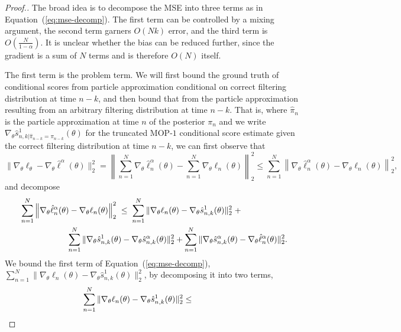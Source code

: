 \begin{proof}[Proof.]    
The broad idea is to decompose the MSE into three terms as in Equation~(\ref{eq:mse-decomp}).
The first term can be controlled by a mixing argument, the second term garners $O(Nk)$ error, and the third term is $O\left(\frac{N}{1-\alpha}\right)$.
It is unclear whether the bias can be reduced further, since the gradient is a sum of $N$ terms and is therefore $O(N)$ itself. 

The first term is the problem term. We will first bound the ground truth of conditional scores from particle approximation conditional on correct filtering distribution at time $n-k$, and then bound that from the particle approximation resulting from an arbitrary filtering distribution at time $n-k$. That is, where $\hat\pi_n$ is the particle approximation at time $n$ of the posterior $\pi_n$ and we write $\nabla_\theta\hat s_{n,k|\hat\pi_{n-k}=\pi_{n-k}}^1(\theta)$ for the truncated MOP-$1$ conditional score estimate given the correct filtering distribution at time $n-k$, we can first observe that
\begin{equation}
    \big\|\nabla_\theta\ell_\theta - \nabla_\theta \hat\ell^\alpha(\theta)\big\|_2^2 =  \left\lVert\sum_{n=1}^N \nabla_\theta \hat\ell_n^\alpha(\theta) - \sum_{n=1}^N \nabla_\theta \ell_n(\theta)\right\rVert_2^2 \leq \sum_{n=1}^N\left\lVert \nabla_\theta \hat\ell_n^\alpha(\theta) -  \nabla_\theta \ell_n(\theta)\right\rVert_2^2,
\end{equation}
and decompose
\begin{align} \nonumber
    & \sum_{n=1}^N\left\lVert \nabla_\theta \hat\ell_n^\alpha(\theta) -  \nabla_\theta \ell_n(\theta)\right\rVert_2^2 \; \leq  \; \sum_{n=1}^N\|\nabla_\theta\ell_n(\theta) - \nabla_\theta\hat s_{n,k}^1(\theta)\|_2^2  \; +
     \\ & \hspace{20mm}
     \sum_{n=1}^N\|\nabla_\theta\hat s_{n,k}^1(\theta) - \nabla_\theta\hat s_{n,k}^\alpha(\theta)\|_2^2 + \sum_{n=1}^N\|\nabla_\theta\hat s_{n,k}^\alpha(\theta) -  \nabla_\theta\hat\ell_n^\alpha(\theta)\|_2^2. \label{eq:mse-decomp}
\end{align}
We bound the first term of Equation~(\ref{eq:mse-decomp}), $\sum_{n=1}^N\|\nabla_\theta\ell_n(\theta) - \nabla_\theta\hat s_{n,k}^1(\theta)\|_2^2$, by decomposing it into two terms, 
\begin{eqnarray}
\nonumber
\hspace{-10mm} \sum_{n=1}^N\|\nabla_\theta\ell_n(\theta) - \nabla_\theta\hat s_{n,k}^1(\theta)\|_2^2 &\leq&

\end{eqnarray}
\end{proof}

